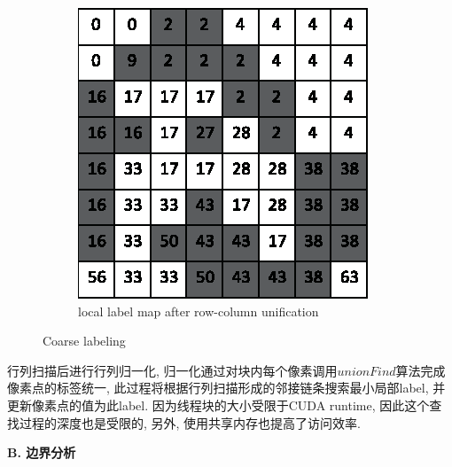 \documentclass[a4paper, 11pt]{article}
\begin{document}
\begin{figure}[H]
\begin{subfigure}[b]{0.3\textwidth}
		\includegraphics[width=\textwidth]{images/cuda_uf/uf_6.eps}
		\caption{local label map after row-column unification}
		\label{fig:cuda_uf_6}
	\end{subfigure}
	\caption{Coarse labeling}
\end{figure}

行列扫描后进行行列归一化, 归一化通过对块内每个像素调用$unionFind$算法完成像素点的标签统一, 此过程将根据行列扫描形成的邻接链条搜索最小局部label, 并更新像素点的值为此label. 因为线程块的大小受限于CUDA runtime, 因此这个查找过程的深度也是受限的, 另外, 使用共享内存也提高了访问效率.

\textbf{B. 边界分析}
\end{document}
